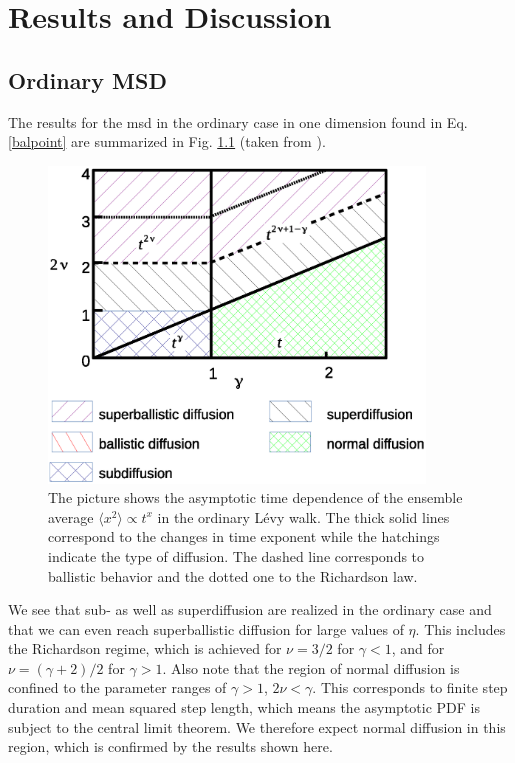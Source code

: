 \chapter{Results and Discussion}

\section{Ordinary MSD}



The results for the \gls*{msd} in the ordinary case in one dimension found in Eq. \ref{balpoint} are summarized in Fig. \ref{fig:resultsMSDordinary} (taken from 
\cite{bothe}).
%
\begin{figure}[htb!]
\begin{center}
\includegraphics[width=100mm]{pics/resultsMSDordinary.eps}
\caption{The picture shows the asymptotic time dependence of the ensemble average $\langle x^2 \rangle \propto t^{x}$ in the ordinary L\'evy walk. The thick solid lines correspond to the changes in time exponent while the hatchings indicate the type of diffusion. The dashed line corresponds to ballistic behavior and the dotted one to the Richardson law.
\label{fig:resultsMSDordinary} }
\end{center}
\end{figure} 
%
We see that sub- as well as superdiffusion are realized in the ordinary case and that we can even reach superballistic diffusion for large values of $\eta$. This includes the Richardson regime, which is achieved for $\nu = 3/2$ for $\gamma <1$, and for $\nu = (\gamma + 2)/2$ for $\gamma > 1$. Also note that the region of normal diffusion is confined to the parameter ranges of $\gamma>1$, $2\nu < \gamma$. This corresponds to finite step duration and mean squared step length, which means the asymptotic \gls*{PDF} is subject to the central limit theorem. We therefore expect normal diffusion in this region, which is confirmed by the results shown here.

